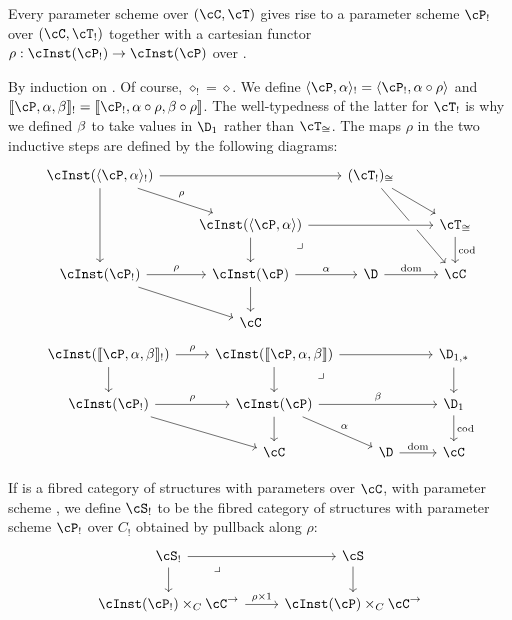 \documentclass[referee]{psp}
\let\S\cS
\let\P\cP
\def\emptyps{\diamond}
\def\typeps#1#2{\langle #1,#2\rangle}
\def\termps#1#2#3{\llbracket #1,#2,#3\rrbracket}
\let\C\cC
\let\T\cT
\def\pullback#1{\ar[#1,phantom,near start,"\lrcorner"]}
\begin{document}
\begin{prob}
  Every parameter scheme \P over $(\C,\T)$ gives rise to a parameter scheme $\P_!$ over $(\C,\T_!)$ together with a cartesian functor $\rho:\cInst(\P_!)\to\cInst(\P)$ over \C.
\end{prob}
\begin{constr}
  By induction on \P.
  Of course, $\emptyps_!=\emptyps$.
  We define $\typeps{\P}{\al}_! = \typeps{\P_!}{\al\circ \rho}$ and $\termps{\P}{\al}{\be}_! = \termps{\P_!}{\al\circ \rho}{\be\circ \rho}$.
  The well-typedness of the latter for $\T_!$ is why we defined $\beta$ to take values in $\D_1$ rather than $\T_{\cong}$.
  The maps $\rho$ in the two inductive steps are defined by the following diagrams:
    \[
    \begin{tikzcd}
      \cInst(\typeps{\P}{\al}_!) \ar[dr,"\rho"] \ar[rr] \ar[dd] && (\T_!)_{\cong} \ar[dr] \ar[ddr] \\
      & \cInst(\typeps{\P}{\al}) \ar[rr,crossing over] \ar[d] \pullback{dr} && \T_{\cong} \ar[d,"\mathrm{cod}"] \\
      \cInst(\P_!) \ar[r,"\rho"] \ar[dr] & \cInst(\P) \ar[r,"\al"] \ar[d] & \D \ar[r,"\mathrm{dom}"] & \C\\
      & \C
    \end{tikzcd}
    \]
    \[
    \begin{tikzcd}
      \cInst(\termps{\P}{\al}{\be}_!) \ar[r,"\rho"] \ar[d] & \cInst(\termps{\P}{\al}{\be}) \ar[rr] \ar[d] \pullback{dr} & & \D_{1,*} \ar[d] \\
      \cInst(\P_!) \ar[r,"\rho"] \ar[dr] & \cInst(\P) \ar[dr,"\al"] \ar[d] \ar[rr,"\be"] & \phantom{.} & \D_1 \ar[d,"\mathrm{cod}"]\\
      & \C & \D \ar[r,"\mathrm{dom}"] & \C
    \end{tikzcd}
    \]
\end{constr}

\begin{defn}
  If \S is a fibred category of structures with parameters over $\C$, with parameter scheme \P, we define $\S_!$ to be the fibred category of structures with parameter scheme $\P_!$ over $C_!$ obtained by pullback along $\rho:$
  \[
  \begin{tikzcd}
    \S_! \ar[r] \ar[d] \pullback{dr} & \S \ar[d] \\
    \cInst(\P_!)\times_C \C^\to \ar[r,"\rho\times 1"] & \cInst(\P)\times_C \C^\to
  \end{tikzcd}
  \]
\end{defn}
\end{document}
